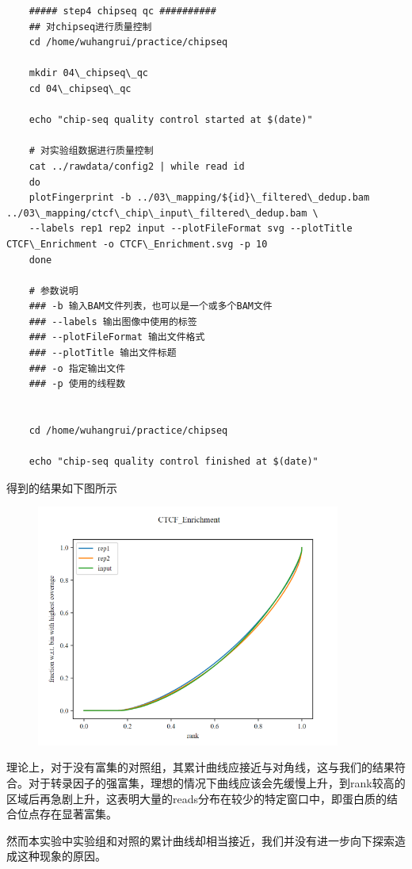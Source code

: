 \begin{lstlisting}
    ##### step4 chipseq qc ##########
    ## 对chipseq进行质量控制
    cd /home/wuhangrui/practice/chipseq

    mkdir 04\_chipseq\_qc
    cd 04\_chipseq\_qc

    echo "chip-seq quality control started at $(date)"

    # 对实验组数据进行质量控制
    cat ../rawdata/config2 | while read id
    do
    plotFingerprint -b ../03\_mapping/${id}\_filtered\_dedup.bam ../03\_mapping/ctcf\_chip\_input\_filtered\_dedup.bam \
    --labels rep1 rep2 input --plotFileFormat svg --plotTitle CTCF\_Enrichment -o CTCF\_Enrichment.svg -p 10
    done

    # 参数说明
    ### -b 输入BAM文件列表，也可以是一个或多个BAM文件
    ### --labels 输出图像中使用的标签
    ### --plotFileFormat 输出文件格式
    ### --plotTitle 输出文件标题
    ### -o 指定输出文件
    ### -p 使用的线程数


    cd /home/wuhangrui/practice/chipseq

    echo "chip-seq quality control finished at $(date)"
\end{lstlisting}


得到的结果如下图所示
\begin{figure}[ht]
    \centering
    \includegraphics[width=10cm]{figure/chipqc.png}
\end{figure}

理论上，对于没有富集的对照组，其累计曲线应接近与对角线，这与我们的结果符合。对于转录因子的强富集，理想的情况下曲线应该会先缓慢上升，到rank较高的区域后再急剧上升，这表明大量的reads分布在较少的特定窗口中，即蛋白质的结合位点存在显著富集。\par
然而本实验中实验组和对照的累计曲线却相当接近，我们并没有进一步向下探索造成这种现象的原因。


